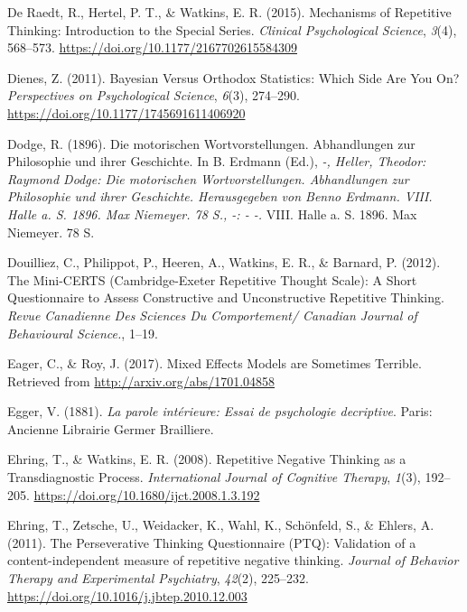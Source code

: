 \documentclass[a4paper,12pt,twoside,openright,oldfontcommands,final]{memoir}
\begin{document}
\leavevmode\hypertarget{ref-de_raedt_mechanisms_2015}{}%
De Raedt, R., Hertel, P. T., \& Watkins, E. R. (2015). Mechanisms of Repetitive Thinking: Introduction to the Special Series. \emph{Clinical Psychological Science}, \emph{3}(4), 568--573. \url{https://doi.org/10.1177/2167702615584309}

\leavevmode\hypertarget{ref-dienes_bayesian_2011}{}%
Dienes, Z. (2011). Bayesian Versus Orthodox Statistics: Which Side Are You On? \emph{Perspectives on Psychological Science}, \emph{6}(3), 274--290. \url{https://doi.org/10.1177/1745691611406920}

\leavevmode\hypertarget{ref-dodge_motorischen_1896}{}%
Dodge, R. (1896). Die motorischen Wortvorstellungen. Abhandlungen zur Philosophie und ihrer Geschichte. In B. Erdmann (Ed.), \emph{-, Heller, Theodor: Raymond Dodge: Die motorischen Wortvorstellungen. Abhandlungen zur Philosophie und ihrer Geschichte. Herausgegeben von Benno Erdmann. VIII. Halle a. S. 1896. Max Niemeyer. 78 S., -: - -.} VIII. Halle a. S. 1896. Max Niemeyer. 78 S.

\leavevmode\hypertarget{ref-Douilliez2012}{}%
Douilliez, C., Philippot, P., Heeren, A., Watkins, E. R., \& Barnard, P. (2012). The Mini-CERTS (Cambridge-Exeter Repetitive Thought Scale): A Short Questionnaire to Assess Constructive and Unconstructive Repetitive Thinking. \emph{Revue Canadienne Des Sciences Du Comportement/ Canadian Journal of Behavioural Science.}, 1--19.

\leavevmode\hypertarget{ref-eager_mixed_2017}{}%
Eager, C., \& Roy, J. (2017). Mixed Effects Models are Sometimes Terrible. Retrieved from \url{http://arxiv.org/abs/1701.04858}

\leavevmode\hypertarget{ref-egger_parole_1881}{}%
Egger, V. (1881). \emph{La parole intérieure: Essai de psychologie decriptive}. Paris: Ancienne Librairie Germer Brailliere.

\leavevmode\hypertarget{ref-ehring_repetitive_2008}{}%
Ehring, T., \& Watkins, E. R. (2008). Repetitive Negative Thinking as a Transdiagnostic Process. \emph{International Journal of Cognitive Therapy}, \emph{1}(3), 192--205. \url{https://doi.org/10.1680/ijct.2008.1.3.192}

\leavevmode\hypertarget{ref-Ehring2011}{}%
Ehring, T., Zetsche, U., Weidacker, K., Wahl, K., Schönfeld, S., \& Ehlers, A. (2011). The Perseverative Thinking Questionnaire (PTQ): Validation of a content-independent measure of repetitive negative thinking. \emph{Journal of Behavior Therapy and Experimental Psychiatry}, \emph{42}(2), 225--232. \url{https://doi.org/10.1016/j.jbtep.2010.12.003}
\end{document}

